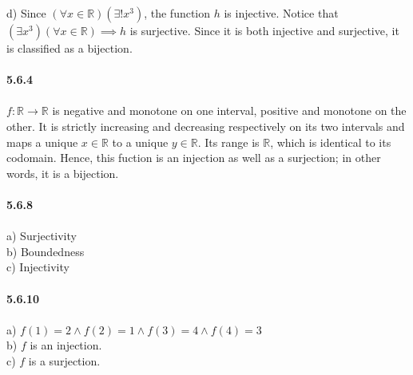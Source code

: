\documentclass[12pt]{article}
\begin{document}
d) Since $(\forall x \in \mathbb{R})(\exists ! x^3)$, the function $h$ is injective. Notice that $(\exists x^3)(\forall x \in \mathbb{R}) \implies h$ is surjective. Since it is both injective and surjective, it is classified as a bijection.\\\\
\textbf{5.6.4}\\\\
$f:\mathbb{R}\to\mathbb{R}$ is negative and monotone on one interval, positive and monotone on the other. It is strictly increasing and decreasing respectively on its two intervals and maps a unique $x \in \mathbb{R}$ to a unique $y \in \mathbb{R}$. Its range is $\mathbb{R}$, which is identical to its codomain. Hence, this fuction is an injection as well as a surjection; in other words, it is a bijection.\\\\
\textbf{5.6.8}\\\\
a) Surjectivity\\
b) Boundedness\\
c) Injectivity\\\\
\textbf{5.6.10}\\\\
a) $f(1)=2 \land f(2)=1 \land f(3)=4 \land f(4)=3$\\
b) $f$ is an injection.\\
c) $f$ is a surjection.
\end{document}
